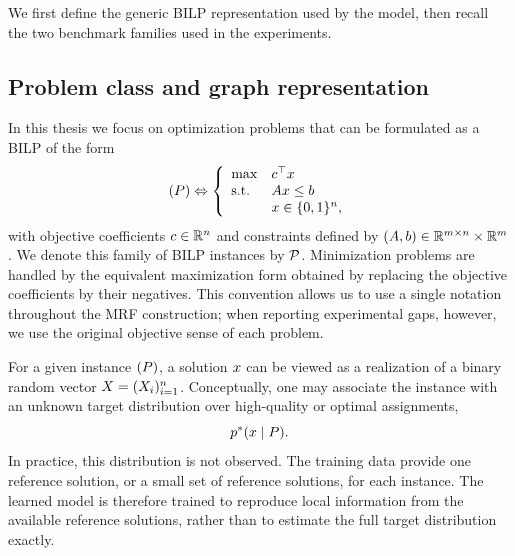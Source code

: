 We first define the generic BILP representation used by the model, then recall the two benchmark families used in the experiments.

\subsection{Problem class and graph representation}
In this thesis we focus on optimization problems that can be formulated as a BILP of the form
\begin{equation}
    (P) \Leftrightarrow 
    \left\{ 
    \begin{array}{ll}
         \max        & c^\top x \\
         \text{s.t.} & A x \leq b \\
                     & x \in \{0,1\}^{n},
    \end{array}
    \right.
\end{equation}
with objective coefficients $c \in \mathbb{R}^n$ and constraints defined by $(A,b) \in \mathbb{R}^{m \times n} \times \mathbb{R}^{m}$. We denote this family of BILP instances by $\mathcal{P}$. Minimization problems are handled by the equivalent maximization form obtained by replacing the objective coefficients by their negatives. This convention allows us to use a single notation throughout the MRF construction; when reporting experimental gaps, however, we use the original objective sense of each problem.


For a given instance $(P)$, a solution $x$ can be viewed as a realization of a binary random vector $X=(X_i)_{i=1}^{n}$. Conceptually, one may associate the instance with an unknown target distribution over high-quality or optimal assignments,
\begin{equation*}
p^*(x \mid P).
\end{equation*}
In practice, this distribution is not observed. The training data provide one reference solution, or a small set of reference solutions, for each instance. The learned model is therefore trained to reproduce local information from the available reference solutions, rather than to estimate the full target distribution exactly.

